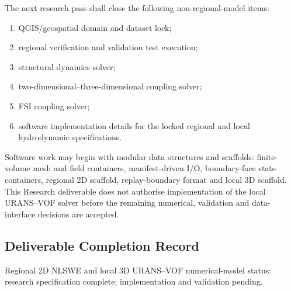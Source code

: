The next research pass shall close the following non-regional-model
items:

\begin{enumerate}
  \item QGIS/geospatial domain and dataset lock;
  \item regional verification and validation test execution;
  \item structural dynamics solver;
  \item two-dimensional--three-dimensional coupling solver;
  \item FSI coupling solver;
  \item software implementation details for the locked regional and
    local hydrodynamic specifications.
\end{enumerate}

Software work may begin with modular data structures and scaffolds:
finite-volume mesh and field containers, manifest-driven I/O,
boundary-face state containers, regional 2D scaffold, replay-boundary
format and local 3D scaffold. This Research deliverable does not
authorise implementation of the local URANS--VOF solver before the
remaining numerical, validation and data-interface decisions are
accepted.

\subsection{Deliverable Completion Record}
\label{sec:res-num-spec-completion-record}

%
%
%

Regional 2D NLSWE and local 3D URANS--VOF numerical-model status:
research specification complete; implementation and validation pending.
